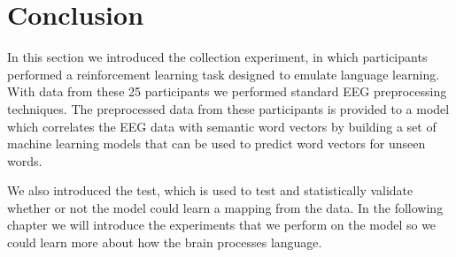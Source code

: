 \section{Conclusion}

In this section we introduced the collection experiment, in which participants 
performed a reinforcement learning task designed to emulate language learning.
With data from these 25 participants we performed standard EEG preprocessing 
techniques. The preprocessed data from these participants is provided to a model
which correlates the EEG data with semantic word vectors by building a set of 
machine learning models that can be used to predict word vectors for unseen 
words.

We also introduced the \tvt test, which is used to test and statistically 
validate whether or not the model could learn a mapping from the data. In the 
following chapter we will introduce the experiments that we perform on the 
model so we could learn more about how the brain processes language.
